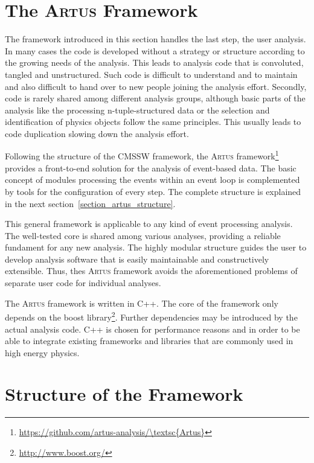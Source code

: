 \documentclass[3p]{elsarticle}
\newcommand{\software}[1]{\textsc{#1}\xspace}
\newcommand{\artus}{\software{Artus}}
\begin{document}
\section{The \artus Framework \label{section_artus_motivation}}

The framework introduced in this section handles the last step, the user analysis. In many cases the code is developed without a strategy or structure according to the growing needs of the analysis. This leads to analysis code that is convoluted, tangled and unstructured. Such code is difficult to understand and to maintain and also difficult to hand over to new people joining the analysis effort. Secondly, code is rarely shared among different analysis groups, although basic parts of the analysis like the processing n-tuple-structured data or the selection and identification of physics objects follow the same principles. This usually leads to code duplication slowing down the analysis effort.

Following the structure of the CMSSW framework, the \artus framework\footnote{\url{https://github.com/artus-analysis/\artus}} provides a front-to-end solution for the analysis of event-based data. The basic concept of modules processing the events within an event loop is complemented by tools for the configuration of every step. The complete structure is explained in the next section~\ref{section_artus_structure}.

This general framework is applicable to any kind of event processing analysis. The well-tested core is shared among various analyses, providing a reliable fundament for any new analysis. The highly modular structure guides the user to develop analysis software that is easily maintainable and constructively extensible. Thus, thes \artus framework avoids the aforementioned problems of separate user code for individual analyses.

The \artus framework is written in C++. The core of the framework only depends on the boost library\footnote{\url{http://www.boost.org/}}. Further dependencies may be introduced by the actual analysis code. C++ is chosen for performance reasons and in order to be able to integrate existing frameworks and libraries that are commonly used in high energy physics.


\section{Structure of the Framework \label{section_artus_structure}}
\end{document}
